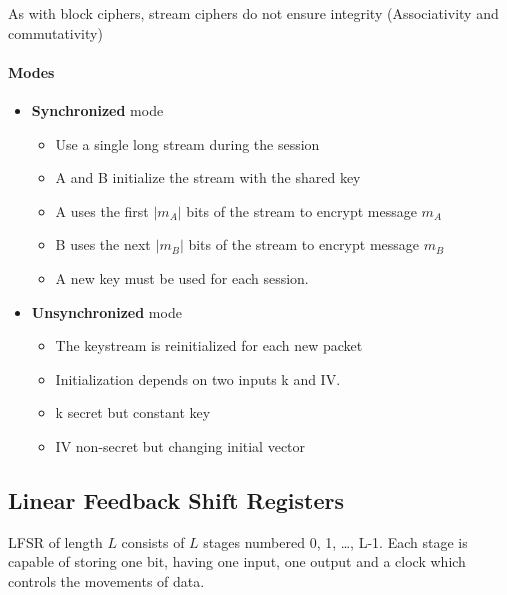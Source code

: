 \begin{center}
    \end{center}

As with block ciphers, stream ciphers do not ensure integrity (Associativity
and commutativity)

\paragraph{Modes}
\begin{itemize}
    \item \textbf{Synchronized} mode
    \begin{itemize}
        \item Use a single long stream during the session
        \item A and B initialize the stream with the shared key
        \item A uses the first $|m_A|$ bits of the stream to encrypt message
        $m_A$
        \item B uses the next $|m_B|$ bits of the stream to encrypt message
        $m_B$
        \item A new key must be used for each session.
    \end{itemize}

\item \textbf{Unsynchronized} mode
    \begin{itemize}
        \item The keystream is reinitialized for each new packet
        \item Initialization depends on two inputs k and IV\@.
        \item k secret but constant key
        \item IV non-secret but changing initial vector
    \end{itemize}
\end{itemize}

\subsection{Linear Feedback Shift Registers}
LFSR of length $L$ consists of $L$ stages numbered 0, 1, \ldots, L-1. 
Each stage is capable of storing one bit, having one input, one output and a
clock which controls the movements of data.

